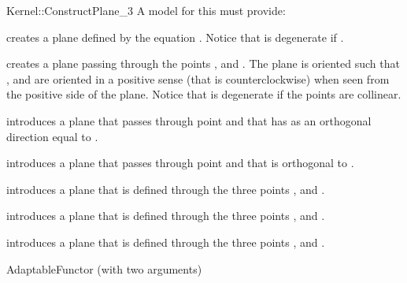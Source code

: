 \begin{ccRefFunctionObjectConcept}{Kernel::ConstructPlane_3}
A model for this must provide:


{creates a plane  defined by the equation
 .
Notice that  is degenerate if .}

{creates a plane  passing through the points ,
  and . The plane is oriented such that , 
  and  are oriented in a positive sense 
 (that is counterclockwise) when seen from the positive side of the plane.
Notice that  is degenerate if the points are collinear.}


{introduces a plane  that passes through point  and
 that has as an orthogonal direction equal to .}

{introduces a plane that passes through point  and
 that is orthogonal to .}

{introduces a plane  that is defined through the  three points 
 ,  and .}

{introduces a plane  that is defined through the  three points 
 ,  and .}

{introduces a plane  that is defined through the  three points 
 ,  and .}

\ccRefines
AdaptableFunctor (with two arguments)

\ccSeeAlso
{} \\

\end{ccRefFunctionObjectConcept}

